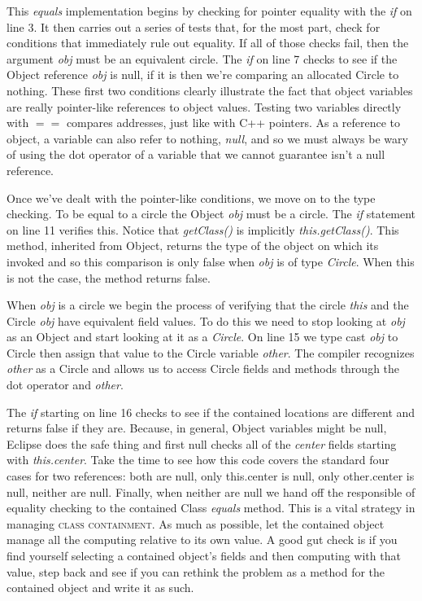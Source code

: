 \documentclass[]{tufte-handout}
\begin{document}
This \textit{equals} implementation begins by checking for pointer equality with the \textit{if} on line 3. It then carries out a series of tests that, for the most part, check for conditions that immediately rule out equality. If all of those checks fail, then the argument \textit{obj} must be an equivalent circle. The \textit{if} on line 7 checks to see if the Object reference \textit{obj} is null, if it is then we're comparing an allocated Circle to nothing. These first two conditions clearly illustrate the fact that object variables are really pointer-like references to object values. Testing two variables directly with $==$ compares addresses, just like with C++ pointers. As a reference to object, a variable can also refer to nothing, \textit{null}, and so we must always be wary of using the dot operator of a variable that we cannot guarantee isn't a null reference. 

Once we've dealt with the pointer-like conditions, we move on to the type checking. To be equal to a circle the Object \textit{obj} must be a circle. The \textit{if} statement on line 11 verifies this. Notice that \textit{getClass()} is implicitly \textit{this.getClass()}. This method, inherited from Object, returns the type of the object on which its invoked and so this comparison is only false when \textit{obj} is of type \textit{Circle}. When this is not the case, the method returns false.

When \textit{obj} is a circle we begin the process of verifying that the circle \textit{this} and the Circle \textit{obj} have equivalent field values. To do this we need to stop looking at \textit{obj} as an Object and start looking at it as a \textit{Circle}. On line 15 we type cast \textit{obj} to Circle then assign that value to the Circle variable \textit{other}. The compiler recognizes \textit{other} as a Circle and allows us to access Circle fields and methods through the dot operator and \textit{other}. 

The \textit{if} starting on line 16 checks to see if the contained locations are different and returns false if they are. Because, in general, Object variables might be null, Eclipse does the safe thing and first null checks all of the \textit{center} fields starting with \textit{this.center}. Take the time to see how this code covers the standard four cases for two references: both are null, only this.center is null, only other.center is null, neither are null. Finally, when neither are null we hand off the responsible of equality checking to the contained Class \textit{equals} method. This is a vital strategy in managing \textsc{class containment}. As much as possible, let the contained object manage all the computing relative to its own value. A good gut check is if you find yourself selecting a contained object's fields and then computing with that value, step back and see if you can rethink the problem as a method for the contained object and write it as such.
\end{document}
